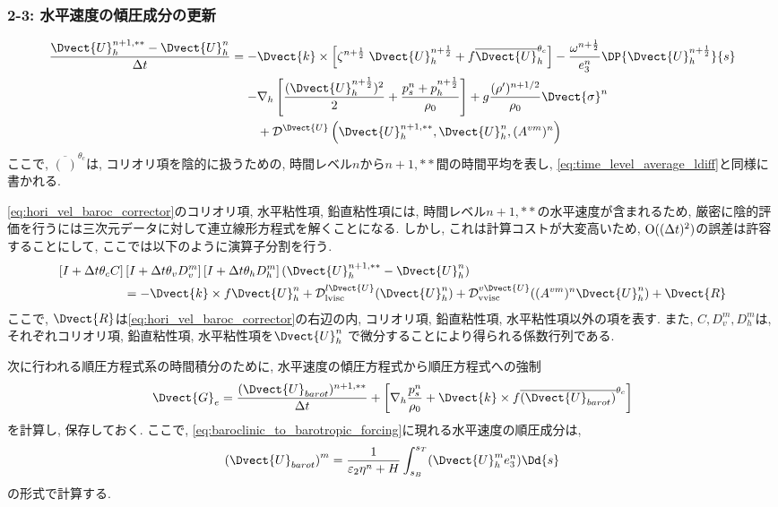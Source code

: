 \subsubsection*{2-3: 水平速度の傾圧成分の更新}
\vspace{-1.2cm}
\begin{align}
 \dfrac{\Dvect{U}_h^{n+1,**} - \Dvect{U}_h^n}{\Delta t}
 =
   -&\Dvect{k}\times \left[ 
       \zeta^{n+\frac{1}{2}} \; \Dvect{U}^{n+\frac{1}{2}}_h
     + f \overline{\Dvect{U}}^{\theta_c}_h   
     \right]
   - \dfrac{\omega^{n+\frac{1}{2}}}{e_3^n} \DP{\Dvect{U}_h^{n+\frac{1}{2}}}{s}
     \nonumber \\
   -& \nabla_h \left[ \dfrac{(\Dvect{U}^{n+\frac{1}{2}}_h)^2}{2} 
       + \dfrac{p^n_s + p^{n+\frac{1}{2}}_h}{\rho_0} \right] 
    + g\dfrac{(\rho')^{n+1/2}}{\rho_0}\Dvect{\sigma}^n \nonumber \\
    &+ \mathcal{D}^{\Dvect{U}} 
          \left( \Dvect{U}_h^{n+1,**}, \Dvect{U}_h^n, (A^{vm})^n \right)
\label{eq:hori_vel_baroc_corrector}
\end{align}
ここで, $\overline{(\;)}^{\theta_c}$は, 
コリオリ項を陰的に扱うための, 時間レベル$n$から$n+1,**$間の時間平均を表し,  
\eqref{eq:time_level_average_ldiff}と同様に書かれる. 

\eqref{eq:hori_vel_baroc_corrector}のコリオリ項,
水平粘性項, 鉛直粘性項には, 時間レベル$n+1,**$の水平速度が含まれるため,
厳密に陰的評価を行うには三次元データに対して連立線形方程式を解くことになる.
しかし, これは計算コストが大変高いため, ${\rm O}((\Delta t)^2)$の誤差は許容することにして, 
ここでは以下のように演算子分割を行う. 
\begin{align}
    \left[I + \Delta t \theta_c C \right]
    &\left[I + \Delta t \theta_v D^m_v \right]
	\left[I + \Delta t \theta_h D^m_h \right]
    (\Dvect{U}_h^{n+1,**} - \Dvect{U}_h^n)    \nonumber \\ 
  &= -
  \Dvect{k} \times f\Dvect{U}_h^n + \mathcal{D}^{l\Dvect{U}}_{\rm lvisc}(\Dvect{U}_h^n)
      + \mathcal{D}^{v\Dvect{U}}_{\rm vvisc}((A^{vm})^n \Dvect{U}_h^n)
      + \Dvect{R}
\end{align}
ここで, $\Dvect{R}$は\eqref{eq:hori_vel_baroc_corrector}の右辺の内, 
コリオリ項, 鉛直粘性項, 水平粘性項以外の項を表す. 
また, $C, D_v^m, D_h^m$は, それぞれコリオリ項, 鉛直粘性項, 水平粘性項を$\Dvect{U}_h^n$
で微分することにより得られる係数行列である. 

次に行われる順圧方程式系の時間積分のために, 水平速度の傾圧方程式から順圧方程式への強制
\begin{align}
 \Dvect{G}_e = \dfrac{(\Dvect{U}_{barot})^{n+1,**}}{\Delta t}
  + \left[
       \nabla_h \dfrac{p_s^n}{\rho_0} 
     + \Dvect{k}\times f \overline{(\Dvect{U}_{barot})}^{\theta_c} 
    \right]
\label{eq:baroclinic_to_barotropic_forcing}
\end{align}
を計算し, 保存しておく. 
ここで, \eqref{eq:baroclinic_to_barotropic_forcing}に現れる水平速度の順圧成分は, 
\begin{align*}
  \left(\Dvect{U}_{barot}\right)^m 
  = \dfrac{1}{\varepsilon_2 \eta^n + H} 
    \int_{s_B}^{s_T} (\Dvect{U}_h^m e_3^n) \Dd{s}
\end{align*}
の形式で計算する. 

